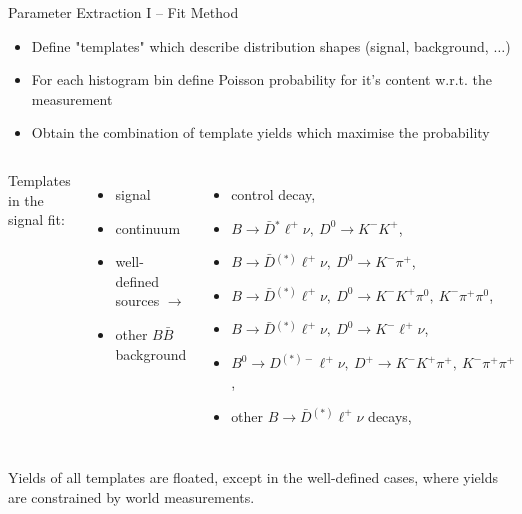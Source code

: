 \documentclass[serif]{beamer}
\begin{document}
\begin{frame}[t]{Parameter Extraction I -- Fit Method}
\vspace{-5mm}
\small

\begin{block}{}
	\begin{itemize}
		\item Define "templates" which describe distribution shapes (signal, background, $\dots$)
		\item For each histogram bin define Poisson probability for it's content w.r.t. the measurement
		\item Obtain the combination of template yields which maximise the probability
	\end{itemize}
\end{block}

\begin{columns}
	Templates in the signal fit:
	\begin{itemize}
		\item signal
		\item continuum
		\item well-defined sources $\to$
		\item other $B \bar B$ background
	\end{itemize}
	\begin{itemize}
		\tiny
		\item control decay,
		\item $B \to \bar{D} {}^* \ell^+ \nu,~D^0 \to K^-K^+$,
		\item $B \to \bar{D} {}^{(*)} \ell^+ \nu,~D^0 \to K^-\pi^+$,
		\item $B \to \bar{D} {}^{(*)} \ell^+ \nu,~D^0 \to K^-K^+\pi^0,~K^-\pi^+\pi^0$,
		\item $B \to \bar{D} {}^{(*)} \ell^+ \nu,~D^0 \to K^-\ell^+\nu$,
		\item $B^0 \to D^{(*)-} \ell^+ \nu,~D^+ \to K^-K^+\pi^+,~K^-\pi^+\pi^+$,
		\item other $B \to \bar D {}^{(*)} \ell^+ \nu$ decays,
	\end{itemize}
\end{columns}

\vspace{2mm}
{\color{red}Yields of all templates are floated, except in the well-defined cases, where yields are constrained by world measurements.}

\end{frame}
\end{document}
